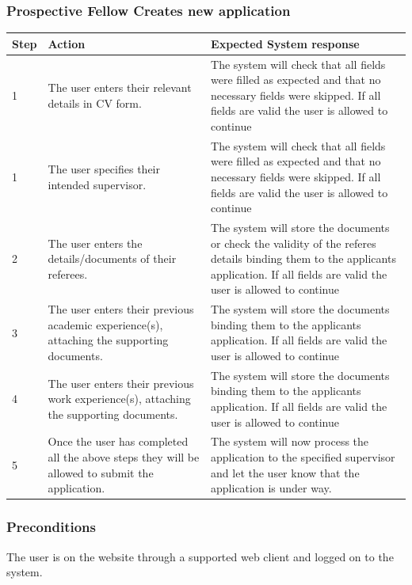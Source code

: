 \documentclass[12pt]{article}
\begin{document}
\subsubsection{Prospective Fellow Creates new application}

\begin{center}
\begin{tabular}{|l|p{6cm}|p{8cm}|}
\hline
Step & Action & Expected System response \\
\hline
1 & The user enters their relevant details in CV form.  & The system will check that all fields were filled as expected and that no necessary fields were skipped. If all fields are valid the user is allowed to continue \\
\hline
1 & The user specifies their intended supervisor.  & The system will check that all fields were filled as expected and that no necessary fields were skipped. If all fields are valid the user is allowed to continue \\
\hline
2 & The user enters the details/documents of their referees.  & The system will store the documents or check the validity of the referes details binding them to the applicants application. If all fields are valid the user is allowed to continue \\
\hline
3 & The user enters their previous academic experience(s), attaching the supporting documents.  & The system will store the documents binding them to the applicants application. If all fields are valid the user is allowed to continue \\
\hline
4 & The user enters their previous work experience(s), attaching the supporting documents.  & The system will store the documents binding them to the applicants application. If all fields are valid the user is allowed to continue \\
5 & Once the user has completed all the above steps they will be allowed to submit the application.  & The system will now process the application to the specified supervisor and let the user know that the application is under way. \\
\hline
\end{tabular}
\end{center}

\subsubsection*{Preconditions}
The user is on the website through a supported web client and logged on to the system.
\end{document}
